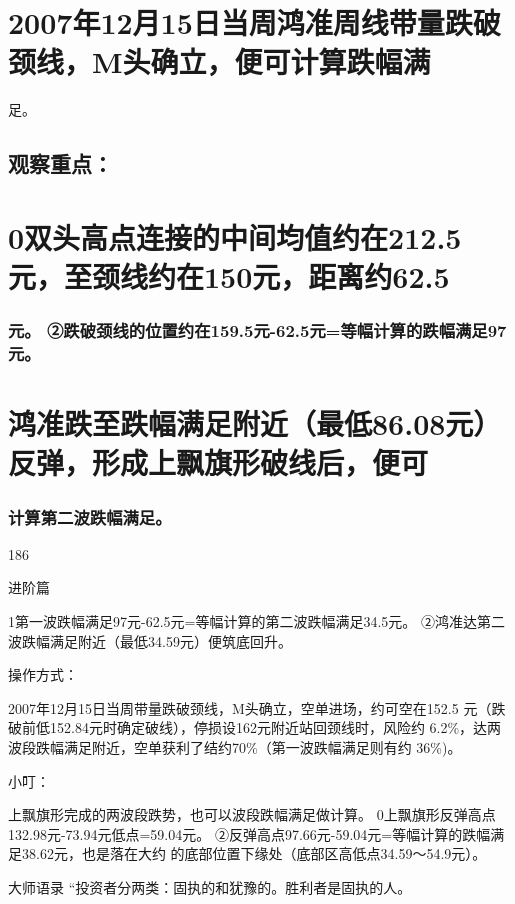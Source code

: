 \documentclass{article}
\begin{document}
\section{2007年12月15日当周鸿准周线带量跌破颈线，M头确立，便可计算跌幅满}

足。

\subsection{观察重点：}

\section{0双头高点连接的中间均值约在212.5元，至颈线约在150元，距离约62.5}

\subsubsection{元。 ②跌破颈线的位置约在159.5元-62.5元=等幅计算的跌幅满足97元。}

\section{鸿准跌至跌幅满足附近（最低86.08元）反弹，形成上飘旗形破线后，便可}

\subsubsection{计算第二波跌幅满足。}

186

\clearpage

进阶篇

1第一波跌幅满足97元-62.5元=等幅计算的第二波跌幅满足34.5元。 ②鸿准达第二波跌幅满足附近（最低34.59元）便筑底回升。

操作方式：

2007年12月15日当周带量跌破颈线，M头确立，空单进场，约可空在152.5 元（跌破前低152.84元时确定破线），停损设162元附近站回颈线时，风险约 6.2\%，达两波段跌幅满足附近，空单获利了结约70\%（第一波跌幅满足则有约 36\%)。

小叮：

上飘旗形完成的两波段跌势，也可以波段跌幅满足做计算。 0上飘旗形反弹高点132.98元-73.94元低点=59.04元。 ②反弹高点97.66元-59.04元=等幅计算的跌幅满足38.62元，也是落在大约 的底部位置下缘处（底部区高低点34.59～54.9元）。

大师语录 “投资者分两类：固执的和犹豫的。胜利者是固执的人。
\end{document}
